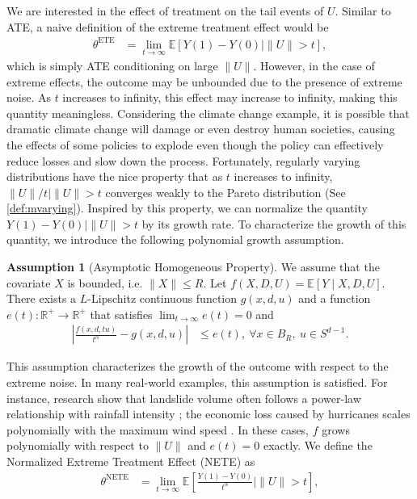 \documentclass[12pt]{article}
\theoremstyle{plain}
\theoremstyle{definition}
\newtheorem{assumption}[theorem]{Assumption}
\newcommand{\tmop}[1]{\ensuremath{\operatorname{#1}}}
\begin{document}
 We are interested in the effect of treatment on the tail events of $U$. Similar to ATE, a naive definition of the extreme treatment effect would be
\begin{align} \label{eq:ete}
  \theta^{\tmop{ETE}} & = \lim_{t \rightarrow \infty} \mathbb{E}[Y(1) - Y(0) \mid \|U\|> t],
\end{align}
which is simply ATE conditioning on large $ \|U\| $. However, in the case of extreme effects, the outcome may be unbounded due to the presence of extreme noise. As $t$ increases to infinity, this effect may increase to infinity, making this quantity meaningless. Considering the climate change example, it is possible that dramatic climate change will damage or even destroy human societies, causing the effects of some policies to explode even though the policy can effectively reduce losses and slow down the process. Fortunately, regularly varying distributions have the nice property that as $t$ increases to infinity, $\|U\|/ t \mid \|U\|> t$ converges weakly to the Pareto distribution (See \cref{def:mvarying}). Inspired by this property, we can normalize the quantity $ Y(1) - Y(0) \mid \|U\| > t $ by its growth rate. To characterize the growth of this quantity, we introduce the following polynomial growth assumption.
\begin{assumption}[Asymptotic Homogeneous Property]\label{assump:f_homo}
  We assume that the covariate $X$ is bounded, i.e. $\|X\| \leqslant R$. Let $f (X, D, U) =\mathbb{E}[Y \mid X, D, U]$. There exists a $L$-Lipschitz continuous function $g (x,
  d, u)$ and a function $e (t) : \mathbb{R}^+ \rightarrow \mathbb{R}^+$ that satisfies $\lim_{t \rightarrow \infty} e (t) = 0$ and
  \begin{align*}
    | \frac{f (x, d, tu)}{t^{\alpha}} - g (x, d, u) | & \leqslant e (t), \ \forall x \in B_R,\  u \in S^{d - 1}.
  \end{align*}
\end{assumption}
This assumption characterizes the growth of the outcome with respect to the extreme noise.  In many real-world examples, this assumption is satisfied. For instance, research show that landslide volume often follows a power-law relationship with rainfall intensity {\cite{tuganishuri2024prediction}}; the economic loss caused by hurricanes scales polynomially with the maximum wind speed {\cite{zhai2014dependence}}. In these cases, $f$ grows polynomially with respect to $\|U\|$ and $e(t) = 0$ exactly.  We define the Normalized Extreme Treatment Effect (NETE) as
\begin{align}\label{eq:nete}
  \theta^{\tmop{NETE}} & = \lim_{t \rightarrow \infty} \mathbb{E} \left[ \frac{Y(1) - Y(0)}{t^{\alpha}} \mid \|U\|> t \right],
\end{align}
\end{document}
